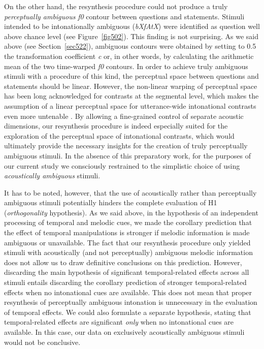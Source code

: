 On the other hand, the resynthesis procedure could not produce a truly \textit{perceptually ambiguous} \textit{f0} contour between questions and statements. Stimuli intended to be intonationally ambiguous (\textit{bXfAtX}) were identified as question well above chance level (see Figure~\ref{fig502}). This finding is not surprising. As we said above (see Section~\ref{sec522}), ambiguous contours were obtained by setting to 0.5 the transformation coefficient \textit{c} or, in other words, by calculating the arithmetic mean of the two time-warped \textit{f0} contours. In order to achieve truly ambiguous stimuli with a procedure of this kind, the perceptual space between questions and statements should be linear. However, the non-linear warping of perceptual space has been long acknowledged for contrasts at the segmental level, which makes the assumption of a linear perceptual space for utterance-wide intonational contrasts even more untenable \citep{gubian2010automatic}. By allowing a fine-grained control of separate acoustic dimensions, our resynthesis procedure is indeed especially suited for the exploration of the perceptual space of intonational contrasts, which would ultimately provide the necessary insights for the creation of truly perceptually ambiguous stimuli. In the absence of this preparatory work, for the purposes of our current study we consciously restrained to the simplistic choice of using \textit{acoustically ambiguous} stimuli.

It has to be noted, however, that the use of acoustically rather than perceptually ambiguous stimuli potentially hinders the complete evaluation of H1 (\textit{orthogonality} hypothesis). As we said above, in the hypothesis of an independent processing of temporal and melodic cues, we made the corollary prediction that the effect of temporal manipulations is stronger if melodic information is made ambiguous or unavailable. The fact that our resynthesis procedure only yielded stimuli with acoustically (and not perceptually) ambiguous melodic information does not allow us to draw definitive conclusions on this prediction. However, discarding the main hypothesis of significant temporal-related effects across all stimuli entails discarding the corollary prediction of stronger temporal-related effects when no intonational cues are available. This does not mean that proper resynthesis of perceptually ambiguous intonation is unnecessary in the evaluation of temporal effects. We could also formulate a separate hypothesis, stating that temporal-related effects are significant \textit{only} when no intonational cues are available. In this case, our data on exclusively acoustically ambiguous stimuli would not be conclusive.

